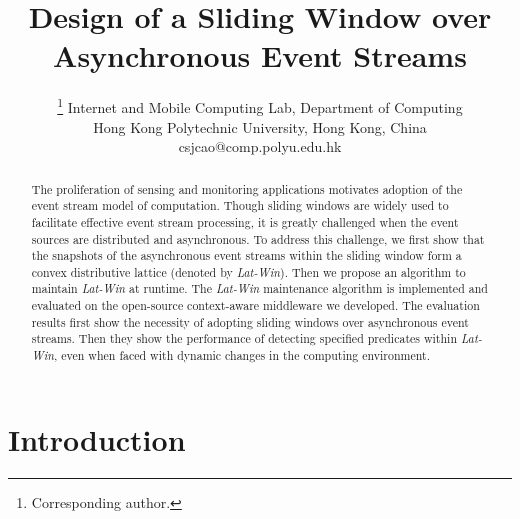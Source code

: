 \documentclass[12pt,journal,letterpaper,compsoc]{IEEEtran}
\begin{document}
\title{Design of a Sliding Window over Asynchronous Event Streams}

\author{
\thanks{Corresponding author.}
Internet and Mobile Computing Lab, Department of Computing\\
Hong Kong Polytechnic University, Hong Kong, China\\
csjcao@comp.polyu.edu.hk
}

\maketitle

\begin{abstract}

The proliferation of sensing and monitoring applications motivates adoption of the event stream model of computation. Though sliding windows are widely used to facilitate effective event stream processing, it is greatly challenged when the event sources are distributed and asynchronous. To address this challenge, we first show that the snapshots of the asynchronous event streams within the sliding window form a convex distributive lattice (denoted by {\it Lat-Win}). Then we propose an algorithm to maintain {\it Lat-Win} at runtime. The {\it Lat-Win} maintenance algorithm is implemented and evaluated on the open-source context-aware middleware we developed. The evaluation results first show the necessity of adopting sliding windows over asynchronous event streams. Then they show the performance of detecting specified predicates within {\it Lat-Win}, even when faced with dynamic changes in the computing environment.

\end{abstract}

\IEEEpeerreviewmaketitle

\section{Introduction}
\label{sec:introduction}
\end{document}
